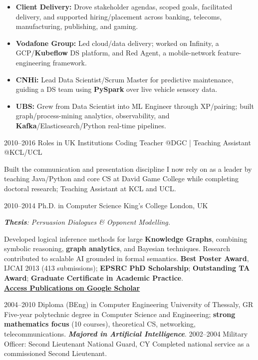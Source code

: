 \documentclass[]{../../../../friggeri-cv}
\begin{document}
\begin{entrylist}
{{        }
        \begin{itemize}[leftmargin=1.1em]
					            \item \small\textbf{Client Delivery:} Drove stakeholder agendas, scoped goals, facilitated delivery, and supported hiring/placement across banking, telecoms, manufacturing, publishing, and gaming.
					            \item \small\textbf{Vodafone Group:} Led cloud/data delivery; worked on Infinity, a GCP/\textbf{Kubeflow} DS platform, and Red Agent, a mobile-network feature-engineering framework.
				            \item \small\textbf{CNHi:} Lead Data Scientist/Scrum Master for predictive maintenance, guiding a DS team using \textbf{PySpark} over live vehicle sensory data.
			            \item \small\textbf{UBS:} Grew from Data Scientist into ML Engineer through XP/pairing; built graph/process-mining analytics, observability, and \textbf{Kafka}/Elasticsearch/Python real-time pipelines.
	        \end{itemize}
    }
    \entry
    {2010–2016}
    {Roles in UK Institutions}
    {\small Coding Teacher @DGC | Teaching Assistant @KCL/UCL}
    {
        {\small
        \setlength{\parindent}{0pt}
        \setlength{\leftskip}{0pt}
	        Built the communication and presentation discipline I now rely on as a leader by teaching Java/Python and core CS at David Game College while completing doctoral research; Teaching Assistant at KCL and UCL.

	        }
	    }
	\end{entrylist}
	\newpage
	\setlength{\parskip}{2pt}
	\setlength{\parsep}{0pt}
\begin{entrylist2}
	\entrytwo
	    {\small 2010–2014}
	    {\small Ph.D. in Computer Science}
	{\small King’s College London, UK}
	    {\small \emph{\textbf{Thesis}: Persuasion Dialogues \& Opponent Modelling.}

		{\footnotesize Developed logical inference methods for large \textbf{Knowledge Graphs}, combining symbolic reasoning, \textbf{graph analytics}, and Bayesian techniques. Research contributed to scalable AI grounded in formal semantics. \textbf{Best Poster Award}, IJCAI 2013 (413 submissions); \textbf{EPSRC PhD Scholarship}; \textbf{Outstanding TA Award}; \textbf{Graduate Certificate in Academic Practice}.
		\\ \textbf{\textcolor{blue}{\href{https://scholar.google.com/citations?hl=en&user=Rr3KTx8AAAAJ}{\underline{Access Publications on Google Scholar}}}}}
		}
	\entrytwo
		{\small  2004–2010}
		{\small Diploma (BEng) in Computer Engineering}
		{\small University of Thessaly, GR}
		{\footnotesize Five-year polytechnic degree in Computer Science and Engineering; \textbf{strong mathematics focus} (10 courses), theoretical CS, networking, telecommunications. \emph{\textbf{Majored in Artificial Intelligence}}.}
	\entrytwo
		{\small  2002–2004}
		{\small Military Officer: Second Lieutenant}
		{\small National Guard, CY}
		{\small Completed national service as a commissioned Second Lieutenant.}
\end{entrylist2}
\end{document}
